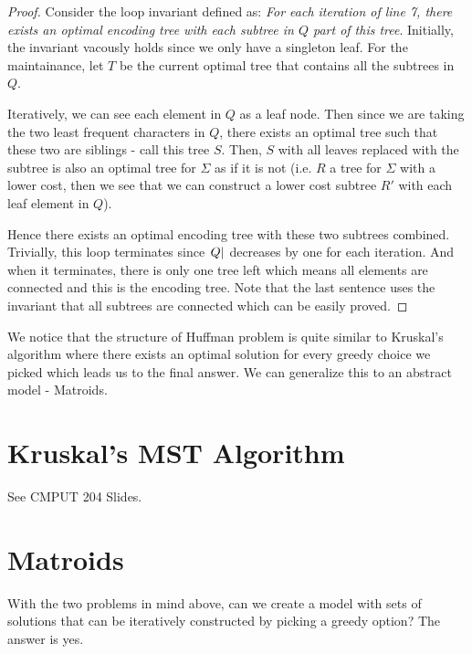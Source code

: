 \begin{proof}
    Consider the loop invariant defined as: \textit{For each iteration of line 7, there exists an optimal encoding tree with each subtree in $Q$ part of this tree}.
    Initially, the invariant vacously holds since we only have a singleton leaf.
    For the maintainance, let $T$ be the current optimal tree that contains all the subtrees in $Q$. 

    Iteratively, we can see each element in $Q$ as a leaf node. 
    Then since we are taking the two least frequent characters in $Q$, there exists an optimal tree such that these two are siblings - call this tree $S$.
    Then, $S$ with all leaves replaced with the subtree is also an optimal tree for $\Sigma$ as if it is not (i.e. $R$ a tree for $\Sigma$ with a lower cost, then we see that we can construct a lower cost subtree $R'$ with each leaf element in $Q$).

    Hence there exists an optimal encoding tree with these two subtrees combined. Trivially, this loop terminates since $\abs{Q}$ decreases by one for each iteration. And when it terminates, there is only one tree left which means all elements are connected and this is the encoding tree.
    Note that the last sentence uses the invariant that all subtrees are connected which can be easily proved. 
\end{proof}

We notice that the structure of Huffman problem is quite similar to Kruskal's algorithm where there exists an optimal solution for every greedy choice we picked which leads us to the final answer.
We can generalize this to an abstract model - Matroids.

\section{Kruskal's MST Algorithm}

See CMPUT 204 Slides.

\section{Matroids}

With the two problems in mind above, can we create a model with sets of solutions that can be iteratively constructed by picking a greedy option? 
The answer is yes. 

